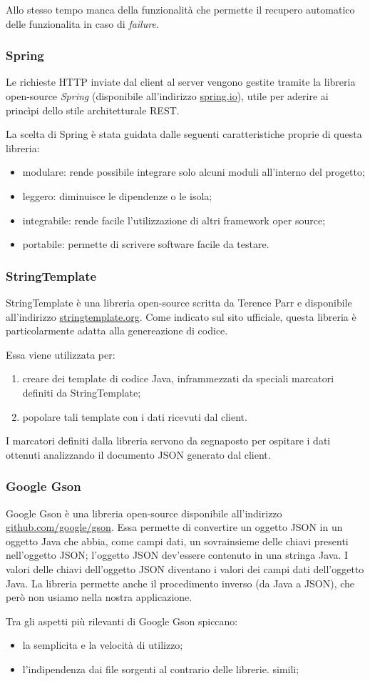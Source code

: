 Allo stesso tempo manca della funzionalità che permette il recupero automatico delle funzionalita in caso di \emph{failure}.

\subsubsection{Spring}
Le richieste HTTP inviate dal client al server vengono gestite tramite la libreria open-source \emph{Spring} (disponibile all'indirizzo \url{spring.io}), utile per aderire ai princìpi dello stile architetturale REST.

La scelta di Spring è stata guidata dalle seguenti caratteristiche proprie di questa libreria:
\begin{itemize}
	\item modulare: rende possibile integrare solo alcuni moduli all'interno del progetto;
	\item leggero: diminuisce le dipendenze o le isola;
	\item integrabile: rende facile l'utilizzazione di altri framework oper source;
	\item portabile: permette di scrivere software facile da testare.
\end{itemize}

\subsubsection{StringTemplate}
StringTemplate è una libreria open-source scritta da Terence Parr e disponibile all'indirizzo \url{stringtemplate.org}. Come indicato sul sito ufficiale, questa libreria è particolarmente adatta alla genereazione di codice. 

Essa viene utilizzata per:
\begin{enumerate}
	\item creare dei template di codice Java, inframmezzati da speciali marcatori definiti da StringTemplate;
	\item popolare tali template con i dati ricevuti dal client.
\end{enumerate}
I marcatori definiti dalla libreria servono da segnaposto per ospitare i dati ottenuti analizzando il documento JSON generato dal client.

\subsubsection{Google Gson}
Google Gson è una libreria open-source disponibile all'indirizzo \url{github.com/google/gson}. Essa permette di convertire un oggetto JSON in un oggetto Java che abbia, come campi dati, un sovrainsieme delle chiavi presenti nell'oggetto JSON; l'oggetto JSON dev'essere contenuto in una stringa Java. I valori delle chiavi dell'oggetto JSON diventano i valori dei campi dati dell'oggetto Java. La libreria permette anche il procedimento inverso (da Java a JSON), che però non usiamo nella nostra applicazione.

Tra gli aspetti più rilevanti di Google Gson spiccano:
\begin{itemize}
	\item la semplicita e la velocità di utilizzo;
	\item l'indipendenza dai file sorgenti al contrario delle librerie. simili;
\end{itemize}
